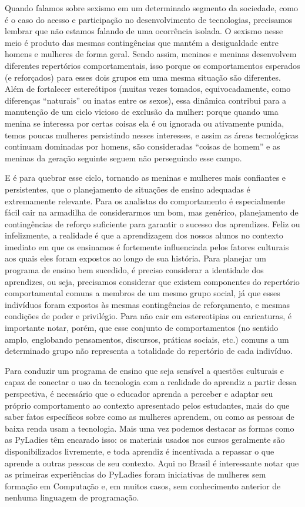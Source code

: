 Quando falamos sobre sexismo em um determinado segmento da sociedade, como é o caso do acesso e participação no desenvolvimento de tecnologias, precisamos lembrar que não estamos falando de uma ocorrência isolada. O sexismo nesse meio é produto das mesmas contingências que mantém a desigualdade entre homens e mulheres de forma geral. Sendo assim, meninos e meninas desenvolvem diferentes repertórios comportamentais, isso porque os comportamentos esperados (e reforçados) para esses dois grupos em uma mesma situação são diferentes. Além de fortalecer estereótipos (muitas vezes tomados, equivocadamente, como diferenças “naturais” ou inatas entre os sexos), essa dinâmica contribui para a manutenção de um ciclo vicioso de exclusão da mulher: porque quando uma menina se interessa por certas coisas ela é ou ignorada ou ativamente punida, temos poucas mulheres persistindo nesses interesses, e assim as áreas tecnológicas continuam dominadas por homens, são consideradas “coisas de homem” e as meninas da geração seguinte seguem não perseguindo esse campo. 

E é para quebrar esse ciclo, tornando as meninas e mulheres mais confiantes e persistentes, que o planejamento de situações de ensino adequadas é extremamente relevante. Para os analistas do comportamento é especialmente fácil cair na armadilha de considerarmos um bom, mas genérico, planejamento de contingências de reforço suficiente para garantir o sucesso dos aprendizes. Feliz ou infelizmente, a realidade é que a aprendizagem dos nossos alunos no contexto imediato em que os ensinamos é fortemente influenciada pelos fatores culturais aos quais eles foram expostos ao longo de sua história. Para planejar um programa de ensino bem sucedido, é preciso considerar a identidade dos aprendizes, ou seja, precisamos considerar que existem componentes do repertório comportamental comuns a membros de um mesmo grupo social, já que esses indivíduos foram expostos às mesmas contingências de reforçamento, e mesmas condições de poder e privilégio. Para não cair em estereotipias ou caricaturas, é importante notar, porém, que esse conjunto de comportamentos (no sentido amplo, englobando pensamentos, discursos, práticas sociais, etc.) comuns a um determinado grupo não representa a totalidade do repertório de cada indivíduo. 

Para conduzir um programa de ensino que seja sensível a questões culturais e capaz de conectar o uso da tecnologia com a realidade do aprendiz a partir dessa perspectiva, é necessário que o educador aprenda a perceber e adaptar seu próprio comportamento ao contexto apresentado pelos estudantes, mais do que saber fatos específicos sobre como as mulheres aprendem, ou como as pessoas de baixa renda usam a tecnologia. Mais uma vez podemos destacar as formas como as PyLadies têm encarado isso: os materiais usados nos cursos geralmente são disponibilizados livremente, e toda aprendiz é incentivada a repassar o que aprende a outras pessoas de seu contexto. Aqui no Brasil é interessante notar que as primeiras experiências do PyLadies foram iniciativas de mulheres sem formação em Computação e, em muitos casos, sem conhecimento anterior de nenhuma linguagem de programação.

